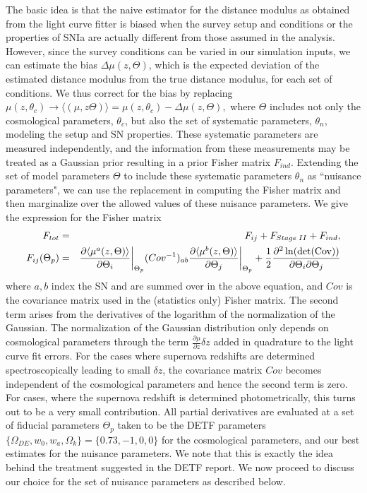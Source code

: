 \documentclass[preprint2]{aastex}    %
\begin{document}
The basic idea is that the naive estimator for the distance modulus as 
obtained from the light curve fitter is biased when the survey setup 
and conditions or the  properties of SNIa are actually different 
from those assumed in the analysis. However, since the survey conditions 
can be varied in our simulation inputs, we can estimate the bias 
$\Delta \mu(z, \Theta)$, 
which is the expected deviation of the estimated distance modulus from the 
true distance modulus, for each set of conditions. We thus correct for 
the bias by replacing $\mu(z,\theta_c) \rightarrow \langle (\mu ,z \Theta)\rangle 
= \mu(z,\theta_c) - \Delta \mu(z, \Theta),$ where $\Theta$ includes not only the 
cosmological parameters, $\theta_c$, but also the set of systematic 
parameters, $\theta_n$, modeling the setup and SN properties. These systematic parameters 
are measured independently, and the information from 
these measurements may be treated as a Gaussian prior resulting 
in a prior Fisher matrix $F_{ind}.$  
Extending the set of model parameters $\Theta$ to include these 
systematic parameters $\theta_n$  as ``nuisance parameters", we can use the
replacement in computing the Fisher matrix and then marginalize over 
the allowed values of these nuisance parameters.  We give the expression for the Fisher matrix 
\begin{eqnarray}
F_{tot} &=& F_{ij} +F_{Stage\;II} + F_{ind},\nonumber\\
F_{ij}(\Theta_p) &=& \frac{\partial{\langle \mu^a(z,\Theta)\rangle}}{\partial 
\Theta_i} \bigg\vert_{\Theta_p}(Cov^{-1})_{ab}
\frac{\partial{\langle\mu^b(z,\Theta)\rangle}}{\partial \Theta_j}\bigg\vert_{\Theta_p}
+\frac{1}{2}\frac{\partial^2\ln(\rm{det} (Cov))}{\partial \Theta_i\partial\Theta_j}
\label{eqn:fisher-sch}
\end{eqnarray}
where $a,b$ index the SN and are summed over in the above equation, and $Cov$ is 
the covariance matrix used in the (statistics only) Fisher matrix.
The second term arises from the derivatives of the logarithm of the
normalization of the Gaussian. The normalization of the Gaussian
distribution only depends on cosmological parameters through the term
$\frac{\partial\mu}{\partial z}\delta z$ added in quadrature to the
light curve fit errors. For the cases where
supernova  redshifts are determined spectroscopically leading to
small $\delta z$, the covariance matrix $Cov$ becomes independent of the
cosmological parameters and hence the second term is zero.  For cases,
where the supernova redshift is determined photometrically, this turns out
to be a very small contribution. All partial derivatives are evaluated at a 
set of fiducial parameters $\Theta_p$ taken to be the DETF parameters 
$\{\Omega_{DE},w_0,w_a,\Omega_k\}=\{0.73,-1,0,0\}$ for the 
cosmological parameters, and our best estimates for the 
nuisance parameters. We note that this is exactly the idea behind the 
treatment suggested in the DETF report. We now proceed to discuss our 
choice for the set of nuisance parameters as described below.
\end{document}
